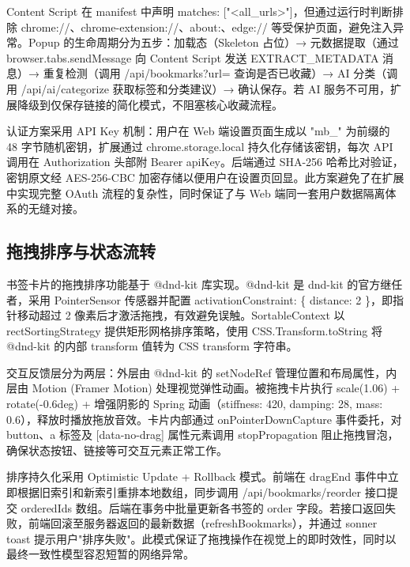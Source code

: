 \documentclass[a4paper,12pt]{ctexart}
\begin{document}
Content Script 在 manifest 中声明 matches: ["<all\_urls>"]，但通过运行时判断排除 chrome://、chrome-extension://、about:、edge:// 等受保护页面，避免注入异常。Popup 的生命周期分为五步：加载态（Skeleton 占位）→ 元数据提取（通过 browser.tabs.sendMessage 向 Content Script 发送 EXTRACT\_METADATA 消息）→ 重复检测（调用 /api/bookmarks?url= 查询是否已收藏）→ AI 分类（调用 /api/ai/categorize 获取标签和分类建议）→ 确认保存。若 AI 服务不可用，扩展降级到仅保存链接的简化模式，不阻塞核心收藏流程。

认证方案采用 API Key 机制：用户在 Web 端设置页面生成以 "mb\_" 为前缀的 48 字节随机密钥，扩展通过 chrome.storage.local 持久化存储该密钥，每次 API 调用在 Authorization 头部附 Bearer {apiKey}。后端通过 SHA-256 哈希比对验证，密钥原文经 AES-256-CBC 加密存储以便用户在设置页回显。此方案避免了在扩展中实现完整 OAuth 流程的复杂性，同时保证了与 Web 端同一套用户数据隔离体系的无缝对接。


\subsection{拖拽排序与状态流转}

书签卡片的拖拽排序功能基于 @dnd-kit 库实现。@dnd-kit 是 dnd-kit 的官方继任者，采用 PointerSensor 传感器并配置 activationConstraint: \{ distance: 2 \}，即指针移动超过 2 像素后才激活拖拽，有效避免误触。SortableContext 以 rectSortingStrategy 提供矩形网格排序策略，使用 CSS.Transform.toString 将 @dnd-kit 的内部 transform 值转为 CSS transform 字符串。

交互反馈层分为两层：外层由 @dnd-kit 的 setNodeRef 管理位置和布局属性，内层由 Motion (Framer Motion) 处理视觉弹性动画。被拖拽卡片执行 scale(1.06) + rotate(-0.6deg) + 增强阴影的 Spring 动画（stiffness: 420, damping: 28, mass: 0.6），释放时播放拖放音效。卡片内部通过 onPointerDownCapture 事件委托，对 button、a 标签及 [data-no-drag] 属性元素调用 stopPropagation 阻止拖拽冒泡，确保状态按钮、链接等可交互元素正常工作。

排序持久化采用 Optimistic Update + Rollback 模式。前端在 dragEnd 事件中立即根据旧索引和新索引重排本地数组，同步调用 /api/bookmarks/reorder 接口提交 orderedIds 数组。后端在事务中批量更新各书签的 order 字段。若接口返回失败，前端回滚至服务器返回的最新数据（refreshBookmarks），并通过 sonner toast 提示用户"排序失败"。此模式保证了拖拽操作在视觉上的即时效性，同时以最终一致性模型容忍短暂的网络异常。
\end{document}
